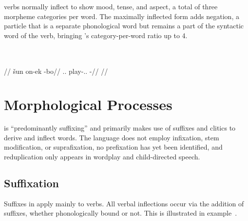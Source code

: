 \langtvk{} verbs normally inflect to show mood, tense, and aspect, a total of three morpheme categories per word. The maximally inflected form adds negation, a particle that is a separate phonological word but remains a part of the syntactic word of the verb, bringing \langtvk's category-per-word ratio up to 4\autocite{wals-22}.

	\begingl
		\glpreamble{}\\
		\\
		//
		\gla šun on-ek -bo//
		\glb \Tps.\An.\Top{} play-\Ind.\Pst.\Pfv{} -\Neg//
		\glft{}//
	\endgl
\xe



\section{Morphological Processes}
\label{sec:tvk-processes}

\langtvk{} is \enquote{predominantly suffixing}\autocite{wals-26} and primarily makes use of suffixes and clitics to derive and inflect words. The language does not employ infixation, stem modification, or suprafixation, no prefixation has yet been identified, and reduplication only appears in wordplay and child-directed speech.

\subsection{Suffixation}
\label{subsec:tvk-suffixation}

Suffixes in \langtvk{} apply mainly to verbs. All verbal inflections occur via the addition of suffixes, whether phonologically bound or not. This is illustrated in example~.

